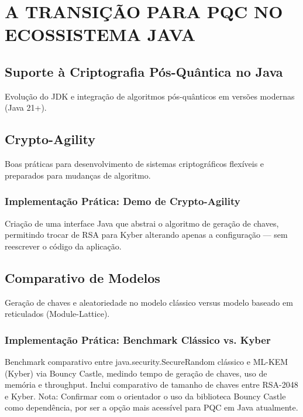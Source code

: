 \documentclass[
	12pt,				%
	openright,			%
	oneside,			%
	a4paper,			%
	portuguese,			%
	brazil				%
	]{abntex2}
\begin{document}
\chapter{A TRANSIÇÃO PARA PQC NO ECOSSISTEMA JAVA} %

    \section{Suporte à Criptografia Pós-Quântica no Java}

    Evolução do JDK e integração de algoritmos pós-quânticos em versões modernas (Java 21+).

    \section{Crypto-Agility}

    Boas práticas para desenvolvimento de sistemas criptográficos flexíveis e preparados para mudanças de algoritmo.

    \subsection{Implementação Prática: Demo de Crypto-Agility}

    Criação de uma interface Java que abstrai o algoritmo de geração de chaves, permitindo trocar de RSA para Kyber alterando apenas a configuração — sem reescrever o código da aplicação.

    \section{Comparativo de Modelos}

    Geração de chaves e aleatoriedade no modelo clássico versus modelo baseado em reticulados (Module-Lattice).

    \subsection{Implementação Prática: Benchmark Clássico vs. Kyber}

    Benchmark comparativo entre java.security.SecureRandom clássico e ML-KEM (Kyber) via Bouncy Castle, medindo tempo de geração de chaves, uso de memória e throughput. 
    Inclui comparativo de tamanho de chaves entre RSA-2048 e Kyber.
    Nota: Confirmar com o orientador o uso da biblioteca Bouncy Castle como dependência, por ser a opção mais acessível para PQC em Java atualmente.
\end{document}
